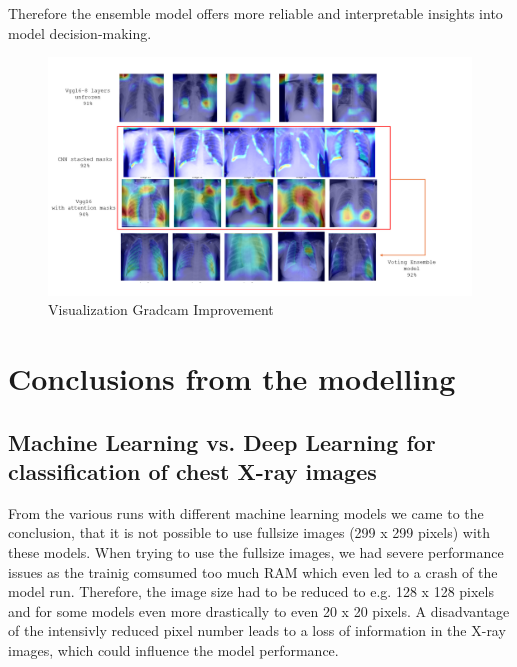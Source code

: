 \documentclass{article}
\begin{document}
Therefore the ensemble model offers more reliable and interpretable insights into model decision-making.

\begin{figure}%
    \centering
    \includegraphics[width=1.0\linewidth]{gradcam_final.png}
    \caption{Visualization Gradcam Improvement}
    \label{fig:Visualization of Gradcam}
\end{figure}




\section{Conclusions from the modelling}



\subsection{Machine Learning vs. Deep Learning for classification of chest X-ray images}

From the various runs with different machine learning models we came to the conclusion, that it is not possible to use fullsize images (299 x 299 pixels) with these models. 
When trying to use the fullsize images, we had severe performance issues as the trainig comsumed too much RAM which even led to a crash of the model run. Therefore, the image size had to be reduced to e.g. 128 x 128 pixels and for some models even more drastically to even 20 x 20 pixels. A disadvantage of the intensivly reduced pixel number leads to a loss of information in the X-ray images, which could influence the model performance. 
\end{document}
